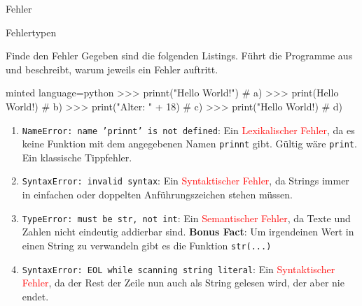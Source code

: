 \begin{task}[points=auto]{Fehler}
\begin{subtask*}[points=0]{Fehlertypen }
\begin{solution}
        \end{solution}
    \end{subtask*}
    \begin{subtask*}[points=0]{Finde den Fehler }
        Gegeben sind die folgenden Listings. Führt die Programme aus und beschreibt, warum jeweils ein Fehler auftritt.
        \begin{codeBlock}[]{minted language=python}
            >>> prinnt("Hello World!") # a)
            >>> print(Hello World!)    # b)
            >>> print("Alter: " + 18)  # c)
            >>> print("Hello World!)   # d)
        \end{codeBlock}
        \begin{solution}
            \begin{enumerate}
                \item \texttt{NameError: name 'prinnt' is not defined}: Ein \textcolor{red}{Lexikalischer Fehler}, da es keine Funktion mit dem angegebenen Namen
                      \texttt	{prinnt} gibt. Gültig wäre \texttt{print}. Ein klassische Tippfehler.
                \item \texttt{SyntaxError: invalid syntax}: Ein \textcolor{red}{Syntaktischer Fehler}, da Strings immer in einfachen oder doppelten Anführungszeichen
                      stehen müssen.
                \item \texttt{TypeError: must be str, not int}: Ein \textcolor{red}{Semantischer Fehler}, da Texte und Zahlen nicht eindeutig addierbar sind.
                      \textbf{Bonus Fact}: Um irgendeinen Wert in einen String zu verwandeln gibt es die Funktion \texttt{str(...)}
                \item \texttt{SyntaxError: EOL while scanning string literal}: Ein \textcolor{red}{Syntaktischer Fehler}, da der Rest der Zeile nun auch als String
                      gelesen wird, der aber nie endet.
            \end{enumerate}

        \end{solution}
    \end{subtask*}
\end{task}
